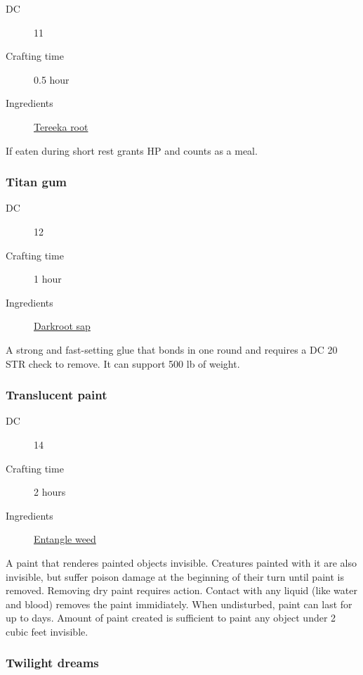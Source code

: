 \begin{description}
\item [DC] 11 \survival
\item [Crafting time] 0.5 hour
\item [Ingredients] \hyperref[Tereeka Root]{Tereeka root}
\end{description}

If eaten during short rest grants  HP and counts as a meal.

\subsubsection{Titan gum}
\label{Titan gum}

\begin{description}
\item [DC] 12 \nature
\item [Crafting time] 1 hour
\item [Ingredients] \hyperref[Darkroot]{Darkroot sap}
\end{description}

A strong and fast-setting glue that bonds in one round and 
requires a DC 20 STR check to remove. It can support 500 lb of weight.

\subsubsection{Translucent paint}
\label{Translucent paint}

\begin{description}
\item [DC] 14 \arcana
\item [Crafting time] 2 hours
\item [Ingredients] \hyperref[Entangle Weed]{Entangle weed}
\end{description}

A paint that renderes painted objects invisible. Creatures painted with it are also invisible, 
but suffer  poison damage at the beginning of their turn until paint is removed. Removing dry paint requires action. 
Contact with any liquid (like water and blood) removes the paint immidiately. 
When undisturbed, paint can last for up to  days. 
Amount of paint created is sufficient to paint any object under 2 cubic feet invisible.

\subsubsection{Twilight dreams}
\label{Twilight dreams}

